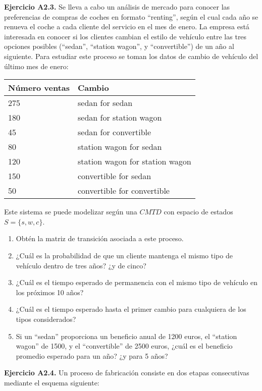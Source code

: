\documentclass[
]{book}
\providecommand{\tightlist}{%
  \setlength{\itemsep}{0pt}\setlength{\parskip}{0pt}}
\theoremstyle{definition}
\theoremstyle{definition}
\theoremstyle{definition}
\theoremstyle{definition}
\theoremstyle{remark}
\begin{document}
\textbf{Ejercicio A2.3.} Se lleva a cabo un análisis de mercado para conocer las preferencias de compras de coches en formato ``renting'', según el cual cada año se renueva el coche a cada cliente del servicio en el mes de enero. La empresa está interesada en conocer si los clientes cambian el estilo de vehículo entre las tres opciones posibles (``sedan'', ``station wagon'', y ``convertible'') de un año al siguiente. Para estudiar este proceso se toman los datos de cambio de vehículo del último mes de enero:

\begin{longtable}[]{@{}ll@{}}
\toprule
Número ventas & Cambio \\
\midrule
\endhead
275 & sedan for sedan \\
180 & sedan for station wagon \\
45 & sedan for convertible \\
80 & station wagon for sedan \\
120 & station wagon for station wagon \\
150 & convertible for sedan \\
50 & convertible for convertible \\
\bottomrule
\end{longtable}

Este sistema se puede modelizar según una \(CMTD\) con espacio de estados \(S = \{s, w, c\}\).

\begin{enumerate}
\def\labelenumi{\arabic{enumi}.}
\tightlist
\item
  Obtén la matriz de transición asociada a este proceso.
\item
  ¿Cuál es la probabilidad de que un cliente mantenga el mismo tipo de vehículo dentro de tres años? ¿y de cinco?
\item
  ¿Cuál es el tiempo esperado de permanencia con el mismo tipo de vehículo en los próximos 10 años?
\item
  ¿Cuál es el tiempo esperado hasta el primer cambio para cualquiera de los tipos considerados?
\item
  Si un ``sedan'' proporciona un beneficio anual de 1200 euros, el ``station wagon'' de 1500, y el ``convertible'' de 2500 euros, ¿cuál es el beneficio promedio esperado para un año? ¿y para 5 años?
\end{enumerate}

\textbf{Ejercicio A2.4.} Un proceso de fabricación consiste en dos etapas consecutivas mediante el esquema siguiente:
\end{document}
